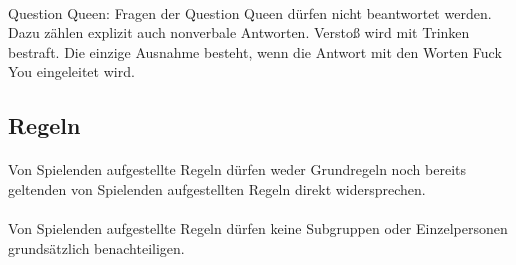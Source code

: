 \paragraph{}
Question Queen: Fragen der Question Queen dürfen nicht beantwortet werden.
Dazu zählen explizit auch nonverbale Antworten. Verstoß wird mit Trinken bestraft.
Die einzige Ausnahme besteht, wenn die Antwort mit den Worten \glqq{} Fuck You\grqq{} eingeleitet wird.

\subsection{Regeln}
\paragraph{}
Von Spielenden aufgestellte Regeln dürfen weder Grundregeln noch bereits geltenden von Spielenden aufgestellten Regeln direkt widersprechen.

\paragraph{}
Von Spielenden aufgestellte Regeln dürfen keine Subgruppen oder Einzelpersonen grundsätzlich benachteiligen.
